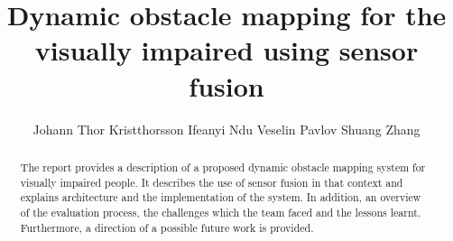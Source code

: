 \documentclass[prodmode,acmtosem]{acmsmall} %
\begin{document}

\title{Dynamic obstacle mapping for the visually impaired using sensor fusion}
\author{Johann Thor Kristthorsson
Ifeanyi Ndu
Veselin Pavlov
Shuang Zhang
}


\begin{abstract}
The report provides a description of a proposed dynamic obstacle mapping system for visually impaired people. It describes the use of sensor fusion in that context and explains architecture and the implementation of the system. In addition, an overview of the evaluation process, the challenges which the team faced and the lessons learnt. Furthermore, a direction of a possible future work is provided.
\end{abstract}


%
%



\end{document}

